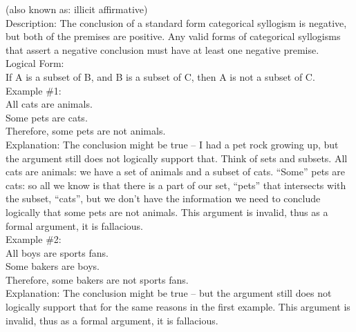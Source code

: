 \documentclass[a4paper,12pt,single,pdftex]{scrartcl}
\begin{document}
        (also known as: illicit affirmative)
      \\

      
        Description: The conclusion of a standard form categorical syllogism is negative, but both of the premises are positive.  Any valid forms of categorical syllogisms that assert a negative conclusion must have at least one negative premise.
      \\

      
        Logical Form:
      \\

      
        If A is a subset of B, and B is a subset of C, then A is not a subset of C.
      \\

      
        Example \#1:
      \\

      
        All cats are animals.
      \\

      
        Some pets are cats.
      \\

      
        Therefore, some pets are not animals.
      \\

      
        Explanation: The conclusion might be true -- I had a pet rock growing up, but the argument still does not logically support that.  Think of sets and subsets.  All cats are animals: we have a set of animals and a subset of cats.  “Some” pets are cats: so all we know is that there is a part of our set, “pets” that intersects with the subset, “cats”, but we don’t have the information we need to conclude logically that some pets are not animals.  This argument is invalid, thus as a formal argument, it is fallacious.
      \\

      
        Example \#2:
      \\

      
        All boys are sports fans.
      \\

      
        Some bakers are boys.
      \\

      
        Therefore, some bakers are not sports fans.
      \\

      
        Explanation: The conclusion might be true -- but the argument still does not logically support that for the same reasons in the first example.  This argument is invalid, thus as a formal argument, it is fallacious.
      \\
\end{document}

